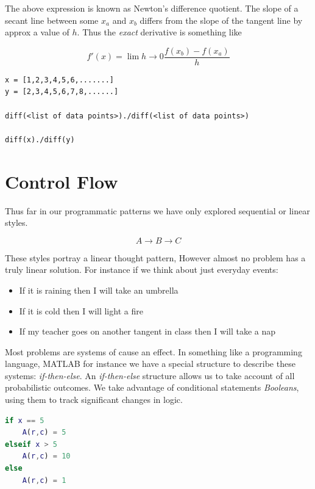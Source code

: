 \documentclass[12pt]{article}
\begin{document}
		The above expression is known as Newton's difference quotient.
		The slope of a secant line between some $x_a$ and $x_b$ differs from the slope of the tangent line by approx a value of $h$.
		Thus the \textit{exact} derivative is something like

		\begin{equation}
			f'(x) = \lim{h\to0} \frac{f(x_b) - f(x_a)}{h}
		\end{equation}

		\begin{lstlisting}[style=pseudocode]
x = [1,2,3,4,5,6,.......]
y = [2,3,4,5,6,7,8,......]

diff(<list of data points>)./diff(<list of data points>)

diff(x)./diff(y)
		\end{lstlisting}

	\section{Control Flow}
		Thus far in our programmatic patterns we have only explored sequential or linear styles.

		$$ A \rightarrow B \rightarrow C $$

		These styles portray a linear thought pattern,
			However almost no problem has a truly linear solution.
		For instance if we think about just everyday events:

		\begin{itemize}
			\item If it is raining then I will take an umbrella
			\item If it is cold then I will light a fire
			\item If my teacher goes on another tangent in class then I will take a nap
		\end{itemize}

		Most problems are systems of cause an effect.
		In something like a programming language,
			MATLAB for instance we have a special structure to describe these systems: \textit{if-then-else}.
		An \textit{if-then-else} structure allows us to take account of all probabilistic outcomes.
		We take advantage of conditional statements \textit{Booleans},
			using them to track significant changes in logic.

		\begin{lstlisting}[language=matlab]
if x == 5
	A(r,c) = 5
elseif x > 5
	A(r,c) = 10
else
	A(r,c) = 1
		\end{lstlisting}
\end{document}
